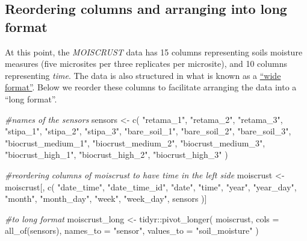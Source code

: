 \documentclass[
  table]{article}
\newenvironment{Shaded}{\begin{snugshade}}{\end{snugshade}}
\newcommand{\AttributeTok}[1]{\textcolor[rgb]{0.77,0.63,0.00}{#1}}
\newcommand{\CommentTok}[1]{\textcolor[rgb]{0.56,0.35,0.01}{\textit{#1}}}
\newcommand{\FunctionTok}[1]{\textcolor[rgb]{0.00,0.00,0.00}{#1}}
\newcommand{\NormalTok}[1]{#1}
\newcommand{\OtherTok}[1]{\textcolor[rgb]{0.56,0.35,0.01}{#1}}
\newcommand{\SpecialCharTok}[1]{\textcolor[rgb]{0.00,0.00,0.00}{#1}}
\newcommand{\StringTok}[1]{\textcolor[rgb]{0.31,0.60,0.02}{#1}}
\begin{document}
\hypertarget{reordering-columns-and-arranging-into-long-format}{%
\subsection{Reordering columns and arranging into long
format}\label{reordering-columns-and-arranging-into-long-format}}

At this point, the \emph{MOISCRUST} data has 15 columns representing
soils moisture measures (five microsites per three replicates per
microsite), and 10 columns representing \emph{time}. The data is also
structured in what is known as a
\href{https://sejdemyr.github.io/r-tutorials/basics/wide-and-long/}{``wide
format''}. Below we reorder these columns to facilitate arranging the
data into a ``long format''.

\begin{Shaded}
\begin{Highlighting}[]
\CommentTok{\#names of the sensors}
\NormalTok{sensors }\OtherTok{\textless{}{-}} \FunctionTok{c}\NormalTok{(}
  \StringTok{"retama\_1"}\NormalTok{,}
  \StringTok{"retama\_2"}\NormalTok{,}
  \StringTok{"retama\_3"}\NormalTok{,}
  \StringTok{"stipa\_1"}\NormalTok{,}
  \StringTok{"stipa\_2"}\NormalTok{,}
  \StringTok{"stipa\_3"}\NormalTok{,}
  \StringTok{"bare\_soil\_1"}\NormalTok{,}
  \StringTok{"bare\_soil\_2"}\NormalTok{,}
  \StringTok{"bare\_soil\_3"}\NormalTok{,}
  \StringTok{"biocrust\_medium\_1"}\NormalTok{,}
  \StringTok{"biocrust\_medium\_2"}\NormalTok{,}
  \StringTok{"biocrust\_medium\_3"}\NormalTok{,}
  \StringTok{"biocrust\_high\_1"}\NormalTok{,}
  \StringTok{"biocrust\_high\_2"}\NormalTok{,}
  \StringTok{"biocrust\_high\_3"}
\NormalTok{)}

\CommentTok{\#reordering columns of moiscrust to have time in the left side}
\NormalTok{moiscrust }\OtherTok{\textless{}{-}}\NormalTok{ moiscrust[, }\FunctionTok{c}\NormalTok{(}
  \StringTok{"date\_time"}\NormalTok{,}
  \StringTok{"date\_time\_id"}\NormalTok{,}
  \StringTok{"date"}\NormalTok{,}
  \StringTok{"time"}\NormalTok{,}
  \StringTok{"year"}\NormalTok{,}
  \StringTok{"year\_day"}\NormalTok{,}
  \StringTok{"month"}\NormalTok{,}
  \StringTok{"month\_day"}\NormalTok{,}
  \StringTok{"week"}\NormalTok{,}
  \StringTok{"week\_day"}\NormalTok{,}
\NormalTok{  sensors}
\NormalTok{)]}

\CommentTok{\#to long format}
\NormalTok{moiscrust\_long }\OtherTok{\textless{}{-}}\NormalTok{ tidyr}\SpecialCharTok{::}\FunctionTok{pivot\_longer}\NormalTok{(}
\NormalTok{  moiscrust,}
  \AttributeTok{cols =} \FunctionTok{all\_of}\NormalTok{(sensors),}
  \AttributeTok{names\_to =} \StringTok{"sensor"}\NormalTok{,}
  \AttributeTok{values\_to =} \StringTok{"soil\_moisture"}
\NormalTok{)}
\end{Highlighting}
\end{Shaded}
\end{document}
